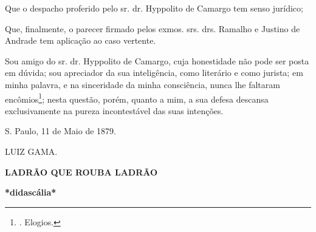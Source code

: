 Que o despacho proferido pelo sr. dr. Hyppolito de Camargo tem senso
jurídico;

Que, finalmente, o parecer firmado pelos exmos. srs. drs. Ramalho e
Justino de Andrade tem aplicação ao caso vertente.

Sou amigo do sr. dr. Hyppolito de Camargo, cuja honestidade não pode ser
posta em dúvida; sou apreciador da sua inteligência, como literário e
como jurista; em minha palavra, e na sinceridade da minha consciência,
nunca lhe faltaram encômios\footnote{. Elogios.}; nesta questão, porém,
quanto a mim, a sua defesa descansa exclusivamente na pureza
incontestável das suas intenções.

S. Paulo, 11 de Maio de 1879.

LUIZ GAMA.

\textbf{LADRÃO QUE ROUBA LADRÃO}

\textbf{*didascália*}


